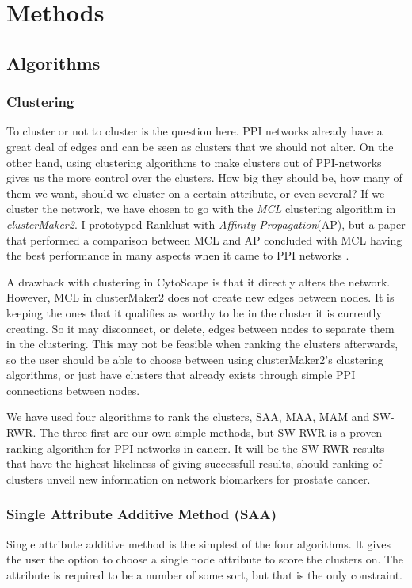 \part{Methods}
\label{pa:methods}
\chapter{Algorithms}
\section{Clustering}
To cluster or not to cluster is the question here. PPI networks already have
a great deal of edges and can be seen as clusters that we should not alter. On
the other hand, using clustering algorithms to make clusters out of
PPI-networks gives us the more control over the clusters. How big they should
be, how many of them we want, should we cluster on a certain attribute, or even
several? If we cluster the network, we have chosen to go with the \textit{MCL}
clustering algorithm in \textit{clusterMaker2}. I prototyped Ranklust with
\textit{Affinity Propagation}(AP), but a paper that performed a comparison
between MCL and AP concluded with MCL having the best performance in many
aspects when it came to PPI networks \cite{ap-vs-mcl}.

A drawback with clustering in CytoScape is that it directly alters the network.
However, MCL in clusterMaker2 does not create new edges between nodes. It is
keeping the ones that it qualifies as worthy to be in the cluster it is
currently creating. So it may disconnect, or delete, edges between nodes to
separate them in the clustering. This may not be feasible when ranking the
clusters afterwards, so the user should be able to choose between using
clusterMaker2's clustering algorithms, or just have clusters that already exists
through simple PPI connections between nodes.

We have used four algorithms to rank the clusters, SAA, MAA, MAM and SW-RWR.
The three first are our own simple methods, but SW-RWR is a proven ranking
algorithm for PPI-networks in cancer. It will be the SW-RWR results that have
the highest likeliness of giving successfull results, should ranking of clusters
unveil new information on network biomarkers for prostate cancer.

\section{Single Attribute Additive Method (SAA)}
Single attribute additive method is the simplest of the four algorithms. It
gives the user the option to choose a single node attribute to score the
clusters on. The attribute is required to be a number of some sort, but that is
the only constraint.


